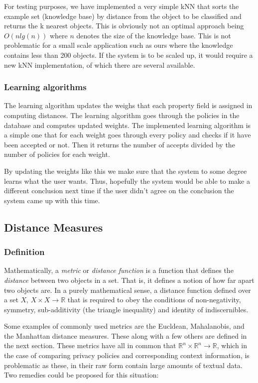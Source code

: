 For testing purposes, we have implemented a very simple kNN that sorts the example set (knowledge base) by distance from the object to be classified and returns the k nearest objects. This is obviously not an optimal approach being $O(n lg(n))$ where $n$ denotes the size of the knowledge base. This is not problematic for a small scale application such as ours where the knowledge contains less than 200 objects. If the system is to be scaled up, it would require a new kNN implementation, of which there are several available.

\subsubsection{Learning algorithms}\label{learnAlgos}
The learning algorithm updates the weighs that each property field is assigned in computing distances. The learning algorithm goes through the policies in the database and computes updated weights. The implemented learning algorithm is a simple one that for each weight goes through every policy and checks if it have been accepted or not. Then it returns the number of accepts divided by the number of policies for each weight.

By updating the weights like this we make sure that the system to some degree learns what the user wants. Thus, hopefully the system would be able to make a different conclusion next time if the user didn't agree on the conclusion the system came up with this time.

\subsection{Distance Measures}\label{SimilarityMeasures}

\subsubsection{Definition}

Mathematically, a \emph{metric} or \emph{distance function} is a function that defines the \emph{distance} between two objects in a set. That is, it defines a notion of how far apart two objects are. In a purely mathematical sense, a distance function defined over a set $X$, $X\times X\longrightarrow \mathbb{R}$ that is required to obey the conditions of non-negativity, symmetry, sub-additivity (the triangle inequality) and identity of indiscernibles. 

Some examples of commonly used metrics are the Eucldean, Mahalanobis, and the Manhattan distance measures. These along with a few others are defined in the next section. These metrics have all in common that $\mathbb{R}^n\times \mathbb{R}^n\longrightarrow \mathbb{R}$, which in the case of comparing privacy policies and corresponding context information, is problematic as these, in their raw form contain large amounts of textual data. Two remedies could be proposed for this situation:

